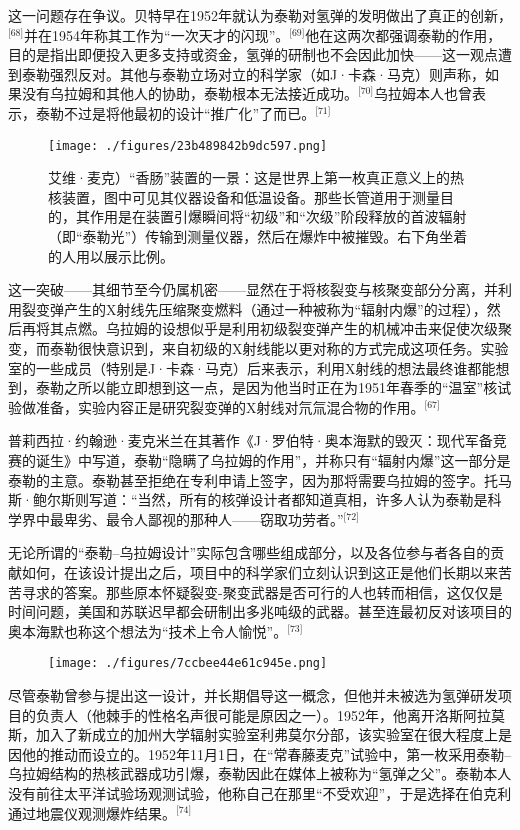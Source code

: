这一问题存在争议。贝特早在1952年就认为泰勒对氢弹的发明做出了真正的创新，\(^\text{[68]}\)并在1954年称其工作为“一次天才的闪现”。\(^\text{[69]}\)他在这两次都强调泰勒的作用，目的是指出即便投入更多支持或资金，氢弹的研制也不会因此加快——这一观点遭到泰勒强烈反对。其他与泰勒立场对立的科学家（如J·卡森·马克）则声称，如果没有乌拉姆和其他人的协助，泰勒根本无法接近成功。\(^\text{[70]}\)乌拉姆本人也曾表示，泰勒不过是将他最初的设计“推广化”了而已。\(^\text{[71]}\)
\begin{figure}[ht]
\centering
\texttt{[image: ./figures/23b489842b9dc597.png]}
\caption{艾维·麦克）“香肠”装置的一景：这是世界上第一枚真正意义上的热核装置，图中可见其仪器设备和低温设备。那些长管道用于测量目的，其作用是在装置引爆瞬间将“初级”和“次级”阶段释放的首波辐射（即“泰勒光”）传输到测量仪器，然后在爆炸中被摧毁。右下角坐着的人用以展示比例。} \label{fig_ADHTL_8}
\end{figure}
这一突破——其细节至今仍属机密——显然在于将核裂变与核聚变部分分离，并利用裂变弹产生的X射线先压缩聚变燃料（通过一种被称为“辐射内爆”的过程），然后再将其点燃。乌拉姆的设想似乎是利用初级裂变弹产生的机械冲击来促使次级聚变，而泰勒很快意识到，来自初级的X射线能以更对称的方式完成这项任务。实验室的一些成员（特别是J·卡森·马克）后来表示，利用X射线的想法最终谁都能想到，泰勒之所以能立即想到这一点，是因为他当时正在为1951年春季的“温室”核试验做准备，实验内容正是研究裂变弹的X射线对氘氚混合物的作用。\(^\text{[67]}\)

普莉西拉·约翰逊·麦克米兰在其著作《J·罗伯特·奥本海默的毁灭：现代军备竞赛的诞生》中写道，泰勒“隐瞒了乌拉姆的作用”，并称只有“辐射内爆”这一部分是泰勒的主意。泰勒甚至拒绝在专利申请上签字，因为那将需要乌拉姆的签字。托马斯·鲍尔斯则写道：“当然，所有的核弹设计者都知道真相，许多人认为泰勒是科学界中最卑劣、最令人鄙视的那种人——窃取功劳者。”\(^\text{[72]}\)

无论所谓的“泰勒–乌拉姆设计”实际包含哪些组成部分，以及各位参与者各自的贡献如何，在该设计提出之后，项目中的科学家们立刻认识到这正是他们长期以来苦苦寻求的答案。那些原本怀疑裂变-聚变武器是否可行的人也转而相信，这仅仅是时间问题，美国和苏联迟早都会研制出多兆吨级的武器。甚至连最初反对该项目的奥本海默也称这个想法为“技术上令人愉悦”。\(^\text{[73]}\)
\begin{figure}[ht]
\centering
\texttt{[image: ./figures/7ccbee44e61c945e.png]}
\caption{} \label{fig_ADHTL_9}
\end{figure}
尽管泰勒曾参与提出这一设计，并长期倡导这一概念，但他并未被选为氢弹研发项目的负责人（他棘手的性格名声很可能是原因之一）。1952年，他离开洛斯阿拉莫斯，加入了新成立的加州大学辐射实验室利弗莫尔分部，该实验室在很大程度上是因他的推动而设立的。1952年11月1日，在“常春藤麦克”试验中，第一枚采用泰勒–乌拉姆结构的热核武器成功引爆，泰勒因此在媒体上被称为“氢弹之父”。泰勒本人没有前往太平洋试验场观测试验，他称自己在那里“不受欢迎”，于是选择在伯克利通过地震仪观测爆炸结果。\(^\text{[74]}\)

